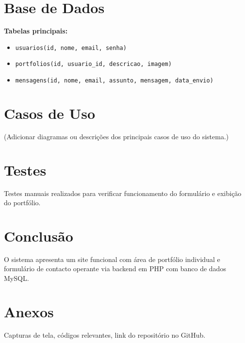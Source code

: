 \documentclass[12pt]{article}
\begin{document}
\section{Base de Dados}
\textbf{Tabelas principais:}
\begin{itemize}
  \item \texttt{usuarios(id, nome, email, senha)}
  \item \texttt{portfolios(id, usuario_id, descricao, imagem)}
  \item \texttt{mensagens(id, nome, email, assunto, mensagem, data\_envio)}
\end{itemize}

\section{Casos de Uso}
(Adicionar diagramas ou descrições dos principais casos de uso do sistema.)

\section{Testes}
Testes manuais realizados para verificar funcionamento do formulário e exibição do portfólio.

\section{Conclusão}
O sistema apresenta um site funcional com área de portfólio individual e formulário de contacto operante via backend em PHP com banco de dados MySQL.

\section{Anexos}
Capturas de tela, códigos relevantes, link do repositório no GitHub.
\end{document}
